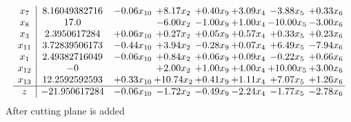 \documentclass[8pt]{article}
\begin{document}
\[\begin{array}{c| c c@{\hskip 2pt} c@{\hskip 2pt} c@{\hskip 2pt} c@{\hskip 2pt} c@{\hskip 2pt} c@{\hskip 2pt} }
 x_{7}   &  8.16049382716 & -0.06 x_{10} & +  8.17 x_{2} & +  0.40 x_{9} & +  3.09 x_{4} & -3.88 x_{5} & +  0.33 x_{6}\\
 x_{8}   &  17.0  &   & -6.00 x_{2} & -1.00 x_{9} & +  1.00 x_{4} & -10.00 x_{5} & -3.00 x_{6}\\
 x_{3}   &  2.3950617284 & +  0.06 x_{10} & +  0.27 x_{2} & +  0.05 x_{9} & +  0.57 x_{4} & +  0.33 x_{5} & +  0.23 x_{6}\\
 x_{11}   &  3.72839506173 & -0.44 x_{10} & +  3.94 x_{2} & -0.28 x_{9} & +  0.07 x_{4} & +  6.49 x_{5} & -7.94 x_{6}\\
 x_{1}   &  2.49382716049 & -0.06 x_{10} & +  0.84 x_{2} & +  0.06 x_{9} & +  0.09 x_{4} & -0.22 x_{5} & +  0.66 x_{6}\\
 x_{12}   &  -0  &   & +  2.00 x_{2} & +  1.00 x_{9} & +  4.00 x_{4} & + 10.00 x_{5} & +  3.00 x_{6}\\
 x_{13}   &  12.2592592593 & +  0.33 x_{10} & + 10.74 x_{2} & +  0.41 x_{9} & +  1.11 x_{4} & +  7.07 x_{5} & +  1.26 x_{6}\\
\hline
z    &  -21.950617284 & -0.06 x_{10} & -1.72 x_{2} & -0.49 x_{9} & -2.24 x_{4} & -1.77 x_{5} & -2.78 x_{6}\\
\end{array}\]
 After cutting plane is added 
\end{document}

